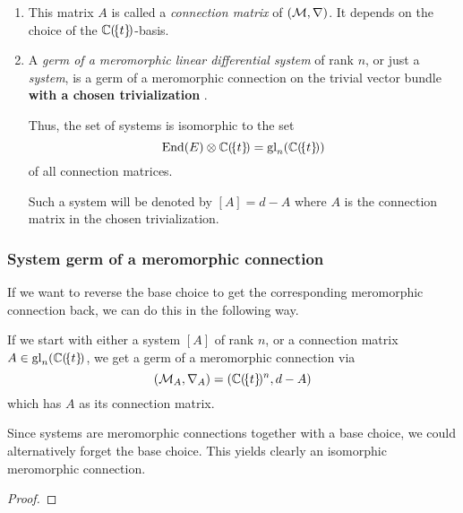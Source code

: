 \begin{comment}
  This means that the connection $\nabla$ is fully determined by the matrix $A$
  and thus is fully determined by $A'$.
\end{comment}
\begin{defn}
  \begin{enumerate}
    \item This matrix $A$ is called a \emph{connection matrix} of
      $(\mathcal{M},\nabla)$. It depends on the choice of the $\mathbb{C}(\!\{t\}\!)$-basis.
      \begin{comment}
        \begin{s-cor}
          As we have seen above, \rewrite{is a connection} fully determined by
          its connection matrix.
        \end{s-cor}
      \end{comment}
    \item A \emph{germ of a meromorphic linear differential system} of rank
      $n$, or just a \emph{system}, is a germ of a meromorphic connection on
      the trivial vector bundle \textbf{with a chosen trivialization}
      .
      \begin{s-prop}
        Thus, the set of systems is isomorphic to the set
        \[
          \operatorname{End}(E)\otimes\mathbb{C}(\!\{t\}\!)=\operatorname{gl}_n(\mathbb{C}(\!\{t\}\!))
        \]
        of all connection matrices.
      \end{s-prop}
      Such a system will be denoted by $[A]=d-A$ where $A$ is the connection
      matrix in the chosen trivialization.
  \end{enumerate}
\end{defn}

\subsubsection{System \rightarrow{} germ of a meromorphic connection}
If we want to reverse the base choice to get the corresponding meromorphic
connection back, we can do this in the following way.
\begin{prop}\label{prop:systToMeromConn}
  If we start with either a system $[A]$ of rank $n$, or a connection matrix
  $A\in\operatorname{gl}_n(\mathbb{C}(\!\{t\}\!)$, we get a germ of a meromorphic connection via
  \[
    (\mathcal{M}_A,\nabla_A)=(\mathbb{C}(\!\{t\}\!)^n,d-A)
  \]
  which has $A$ as its connection matrix.
  \begin{s-rem}
    Since systems are meromorphic connections together with a base choice, we
    could alternatively forget the base choice. This yields clearly an
    isomorphic meromorphic connection.
  \end{s-rem}
\end{prop}
\begin{proof}
  \TODO{}
\end{proof}

